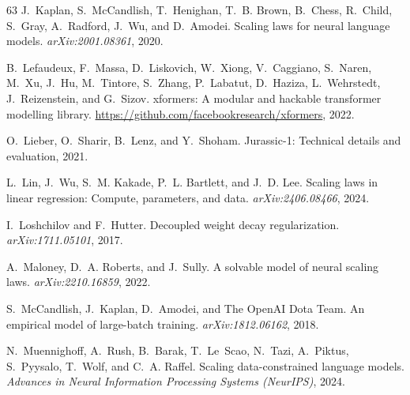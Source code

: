 \documentclass{article}
\theoremstyle{plain}
\theoremstyle{definition}
\theoremstyle{remark}
\begin{document}
\begin{thebibliography}{63}
J.~Kaplan, S.~McCandlish, T.~Henighan, T.~B. Brown, B.~Chess, R.~Child, S.~Gray, A.~Radford, J.~Wu, and D.~Amodei.
\newblock Scaling laws for neural language models.
\newblock \emph{arXiv:2001.08361}, 2020.

B.~Lefaudeux, F.~Massa, D.~Liskovich, W.~Xiong, V.~Caggiano, S.~Naren, M.~Xu, J.~Hu, M.~Tintore, S.~Zhang, P.~Labatut, D.~Haziza, L.~Wehrstedt, J.~Reizenstein, and G.~Sizov.
\newblock xformers: A modular and hackable transformer modelling library.
\newblock \url{https://github.com/facebookresearch/xformers}, 2022.

O.~Lieber, O.~Sharir, B.~Lenz, and Y.~Shoham.
\newblock Jurassic-1: Technical details and evaluation, 2021.

L.~Lin, J.~Wu, S.~M. Kakade, P.~L. Bartlett, and J.~D. Lee.
\newblock Scaling laws in linear regression: Compute, parameters, and data.
\newblock \emph{arXiv:2406.08466}, 2024.

I.~Loshchilov and F.~Hutter.
\newblock Decoupled weight decay regularization.
\newblock \emph{arXiv:1711.05101}, 2017.

A.~Maloney, D.~A. Roberts, and J.~Sully.
\newblock A solvable model of neural scaling laws.
\newblock \emph{arXiv:2210.16859}, 2022.

S.~McCandlish, J.~Kaplan, D.~Amodei, and {The OpenAI Dota Team}.
\newblock An empirical model of large-batch training.
\newblock \emph{arXiv:1812.06162}, 2018.

N.~Muennighoff, A.~Rush, B.~Barak, T.~Le~Scao, N.~Tazi, A.~Piktus, S.~Pyysalo, T.~Wolf, and C.~A. Raffel.
\newblock Scaling data-constrained language models.
\newblock \emph{Advances in Neural Information Processing Systems (NeurIPS)}, 2024.


\end{thebibliography}
\end{document}
